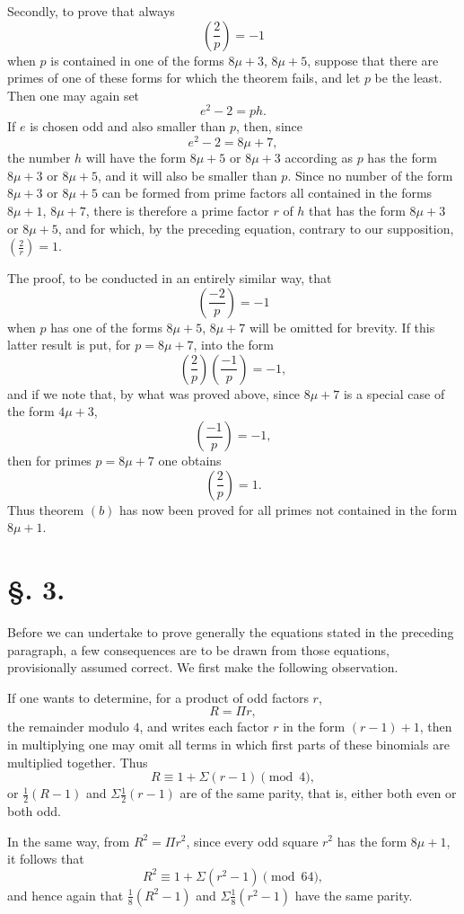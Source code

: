 \documentclass[11pt]{article}
\newcommand{\J}[2]{\left(\frac{#1}{#2}\right)}
\begin{document}
Secondly, to prove that always
\[
 \J{2}{p}=-1
\]
when $p$ is contained in one of the forms $8\mu+3$, $8\mu+5$, suppose that there are primes of one of these forms for which the theorem fails, and let $p$ be the least. Then one may again set
\[
 e^2-2=ph.
\]
If $e$ is chosen odd and also smaller than $p$, then, since
\[
 e^2-2=8\mu+7,
\]
the number $h$ will have the form $8\mu+5$ or $8\mu+3$ according as $p$ has the form $8\mu+3$ or $8\mu+5$, and it will also be smaller than $p$. Since no number of the form $8\mu+3$ or $8\mu+5$ can be formed from prime factors all contained in the forms $8\mu+1$, $8\mu+7$, there is therefore a prime factor $r$ of $h$ that has the form $8\mu+3$ or $8\mu+5$, and for which, by the preceding equation, contrary to our supposition, $\J{2}{r}=1$.

The proof, to be conducted in an entirely similar way, that
\[
 \J{-2}{p}=-1
\]
when $p$ has one of the forms $8\mu+5$, $8\mu+7$ will be omitted for brevity. If this latter result is put, for $p=8\mu+7$, into the form
\[
 \J{2}{p}\J{-1}{p}=-1,
\]
and if we note that, by what was proved above, since $8\mu+7$ is a special case of the form $4\mu+3$,
\[
 \J{-1}{p}=-1,
\]
then for primes $p=8\mu+7$ one obtains
\[
 \J{2}{p}=1.
\]
Thus theorem $(b)$ has now been proved for all primes not contained in the form $8\mu+1$.

\section*{\S. 3.}

Before we can undertake to prove generally the equations stated in the preceding paragraph, a few consequences are to be drawn from those equations, provisionally assumed correct. We first make the following observation.

If one wants to determine, for a product of odd factors $r$,
\[
 R=\Pi r,
\]
the remainder modulo $4$, and writes each factor $r$ in the form $(r-1)+1$, then in multiplying one may omit all terms in which first parts of these binomials are multiplied together. Thus
\[
 R\equiv1+\Sigma(r-1)\pmod4,
\]
or $\frac12(R-1)$ and $\Sigma\frac12(r-1)$ are of the same parity, that is, either both even or both odd.

In the same way, from $R^2=\Pi r^2$, since every odd square $r^2$ has the form $8\mu+1$, it follows that
\[
 R^2\equiv1+\Sigma(r^2-1)\pmod {64},
\]
and hence again that $\frac18(R^2-1)$ and $\Sigma\frac18(r^2-1)$ have the same parity.
\end{document}
